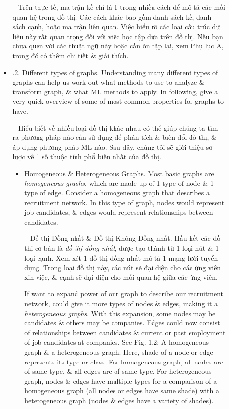 \documentclass{article}
\begin{document}
\begin{itemize}
\begin{itemize}
\begin{itemize}
            -- Trên thực tế, ma trận kề chỉ là 1 trong nhiều cách để mô tả các mối quan hệ trong đồ thị. Các cách khác bao gồm danh sách kề, danh sách cạnh, hoặc ma trận liên quan. Việc hiểu rõ các loại cấu trúc dữ liệu này rất quan trọng đối với việc học tập dựa trên đồ thị. Nếu bạn chưa quen với các thuật ngữ này hoặc cần ôn tập lại, xem Phụ lục A, trong đó có thêm chi tiết \& giải thích.
            \item {.2. Different types of graphs.} Understanding many different types of graphs can help us work out what methods to use to analyze \& transform graph, \& what ML methods to apply. In following, give a very quick overview of some of most common properties for graphs to have.

            -- Hiểu biết về nhiều loại đồ thị khác nhau có thể giúp chúng ta tìm ra phương pháp nào cần sử dụng để phân tích \& biến đổi đồ thị, \& áp dụng phương pháp ML nào. Sau đây, chúng tôi sẽ giới thiệu sơ lược về 1 số thuộc tính phổ biến nhất của đồ thị.
            \begin{itemize}
                \item {\sf Homogeneous \& Heterogeneous Graphs.} Most basic graphs are {\it homogeneous graphs}, which are made up of 1 type of node \& 1 type of edge. Consider a homogeneous graph that describes a recruitment network. In this type of graph, nodes would represent job candidates, \& edges would represent relationships between candidates.

                -- {\sf Đồ thị Đồng nhất \& Đồ thị Không Đồng nhất.} Hầu hết các đồ thị cơ bản là {\it đồ thị đồng nhất}, được tạo thành từ 1 loại nút \& 1 loại cạnh. Xem xét 1 đồ thị đồng nhất mô tả 1 mạng lưới tuyển dụng. Trong loại đồ thị này, các nút sẽ đại diện cho các ứng viên xin việc, \& cạnh sẽ đại diện cho mối quan hệ giữa các ứng viên.

                If want to expand power of our graph to describe our recruitment network, could give it more types of nodes \& edges, making it a {\it heterogeneous graphs}. With this expansion, some nodes may be candidates \& others may be companies. Edges could now consist of relationships between candidates \& current or past employment of job candidates at companies. See {\sf Fig. 1.2: A homogeneous graph \& a heterogeneous graph. Here, shade of a node or edge represents its type or class. For homogeneous graph, all nodes are of same type, \& all edges are of same type. For heterogeneous graph, nodes \& edges have multiple types} for a comparison of a homogeneous graph (all nodes or edges have same shade) with a heterogeneous graph (nodes \& edges have a variety of shades).


\end{itemize}
\end{itemize}
\end{itemize}
\end{itemize}
\end{document}
